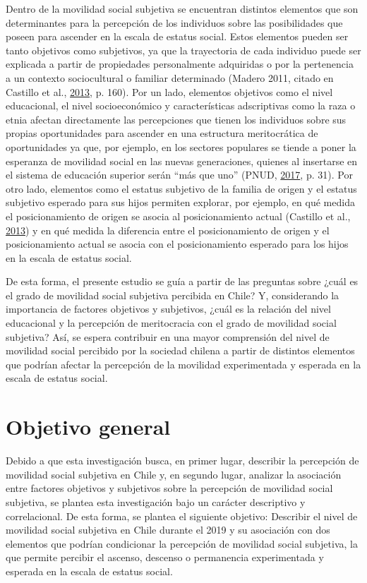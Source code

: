 \documentclass[
]{article}
\begin{document}
Dentro de la movilidad social subjetiva se encuentran distintos
elementos que son determinantes para la percepción de los individuos
sobre las posibilidades que poseen para ascender en la escala de estatus
social. Estos elementos pueden ser tanto objetivos como subjetivos, ya
que la trayectoria de cada individuo puede ser explicada a partir de
propiedades personalmente adquiridas o por la pertenencia a un contexto
sociocultural o familiar determinado (Madero 2011, citado en Castillo et
al., \protect\hyperlink{ref-castillo_Todos_2013}{2013}, p. 160). Por un
lado, elementos objetivos como el nivel educacional, el nivel
socioeconómico y características adscriptivas como la raza o etnia
afectan directamente las percepciones que tienen los individuos sobre
sus propias oportunidades para ascender en una estructura meritocrática
de oportunidades ya que, por ejemplo, en los sectores populares se
tiende a poner la esperanza de movilidad social en las nuevas
generaciones, quienes al insertarse en el sistema de educación superior
serán ``más que uno'' (PNUD,
\protect\hyperlink{ref-pnud_Desiguales_2017}{2017}, p. 31). Por otro
lado, elementos como el estatus subjetivo de la familia de origen y el
estatus subjetivo esperado para sus hijos permiten explorar, por
ejemplo, en qué medida el posicionamiento de origen se asocia al
posicionamiento actual (Castillo et al.,
\protect\hyperlink{ref-castillo_Todos_2013}{2013}) y en qué medida la
diferencia entre el posicionamiento de origen y el posicionamiento
actual se asocia con el posicionamiento esperado para los hijos en la
escala de estatus social.

De esta forma, el presente estudio se guía a partir de las preguntas
sobre ¿cuál es el grado de movilidad social subjetiva percibida en
Chile? Y, considerando la importancia de factores objetivos y
subjetivos, ¿cuál es la relación del nivel educacional y la percepción
de meritocracia con el grado de movilidad social subjetiva? Así, se
espera contribuir en una mayor comprensión del nivel de movilidad social
percibido por la sociedad chilena a partir de distintos elementos que
podrían afectar la percepción de la movilidad experimentada y esperada
en la escala de estatus social.

\hypertarget{objetivo-general}{%
\section{Objetivo general}\label{objetivo-general}}

Debido a que esta investigación busca, en primer lugar, describir la
percepción de movilidad social subjetiva en Chile y, en segundo lugar,
analizar la asociación entre factores objetivos y subjetivos sobre la
percepción de movilidad social subjetiva, se plantea esta investigación
bajo un carácter descriptivo y correlacional. De esta forma, se plantea
el siguiente objetivo: Describir el nivel de movilidad social subjetiva
en Chile durante el 2019 y su asociación con dos elementos que podrían
condicionar la percepción de movilidad social subjetiva, la que permite
percibir el ascenso, descenso o permanencia experimentada y esperada en
la escala de estatus social.
\end{document}
